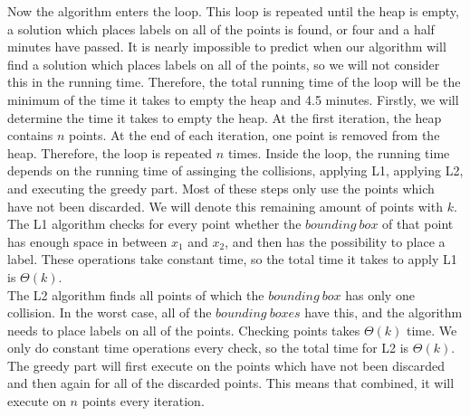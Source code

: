 \documentclass[crop=false,a4paper,oneside,11pt]{article}
\begin{document}
Now the algorithm enters the loop. This loop is repeated until the heap is empty, a solution which places labels on all of the points is found, or four and a half minutes have passed. It is nearly impossible to predict when our algorithm will find a solution which places labels on all of the points, so we will not consider this in the running time. Therefore, the total running time of the loop will be the minimum of the time it takes to empty the heap and 4.5 minutes. Firstly, we will determine the time it takes to empty the heap. At the first iteration, the heap contains $n$ points. At the end of each iteration, one point is removed from the heap. Therefore, the loop is repeated $n$ times. Inside the loop, the running time depends on the running time of assinging the collisions, applying L1, applying L2, and executing the greedy part. Most of these steps only use the points which have not been discarded. We will denote this remaining amount of points with $k$. \\ The L1 algorithm checks for every point whether the $bounding \ box$ of that point has enough space in between $x_1$ and $x_2$, and then has the possibility to place a label. These operations take constant time, so the total time it takes to apply L1 is $\Theta(k)$. \\
The L2 algorithm finds all points of which the $bounding \ box$ has only one collision. In the worst case, all of the $bounding \ boxes$ have this, and the algorithm needs to place labels on all of the points. Checking points takes $\Theta(k)$ time. We only do constant time operations every check, so the total time for L2 is $\Theta(k)$. \\
The greedy part will first execute on the points which have not been discarded and then again for all of the discarded points. This means that combined, it will execute on $n$ points every iteration.  
\end{document}
